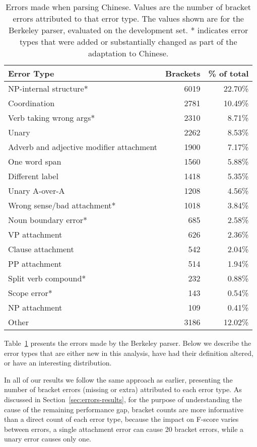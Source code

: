 \begin{table}
\centering
\begin{tabular}{lrr}
  \hline
  Error Type & Brackets & \% of total \\
  \hline
  \hline
    NP-internal structure* & 6019 & 22.70\% \\
              Coordination & 2781 & 10.49\% \\
   Verb taking wrong args* & 2310 &  8.71\% \\
                     Unary & 2262 &  8.53\% \\
Adverb and adjective modifier attachment & 1900 &  7.17\% \\
             One word span & 1560 &  5.88\% \\
           Different label & 1418 &  5.35\% \\
            Unary A-over-A & 1208 &  4.56\% \\
   Wrong sense/bad attachment* & 1018 &  3.84\% \\
      Noun boundary error* &  685 &  2.58\% \\
             VP attachment &  626 &  2.36\% \\
         Clause attachment &  542 &  2.04\% \\
             PP attachment &  514 &  1.94\% \\
      Split verb compound* &  232 &  0.88\% \\
              Scope error* &  143 &  0.54\% \\
             NP attachment &  109 &  0.41\% \\
                     Other & 3186 & 12.02\% \\
\hline
\end{tabular}
\caption[Breakdown of errors in Chinese parsing.]{ \label{tab:errors} 
  Errors made when parsing Chinese. Values are the number of bracket errors
  attributed to that error type. The values shown are for the Berkeley parser,
  evaluated on the development set. * indicates error types that were added or
  substantially changed as part of the adaptation to Chinese.
}
\end{table}

Table~\ref{tab:errors} presents the errors made by the Berkeley parser.
Below we describe the error types that are either new in this analysis, have had their definition altered, or have an interesting distribution.

In all of our results we follow the same approach as earlier, presenting the number of bracket errors (missing or extra) attributed to each error type.
As discussed in Section~\ref{sec:errors-results}, for the purpose of understanding the cause of the remaining performance gap, bracket counts are more informative than a direct count of each error type, because the impact on \parseval F-score varies between errors, \myeg a single attachment error can cause 20 bracket errors, while a unary error causes only one.

